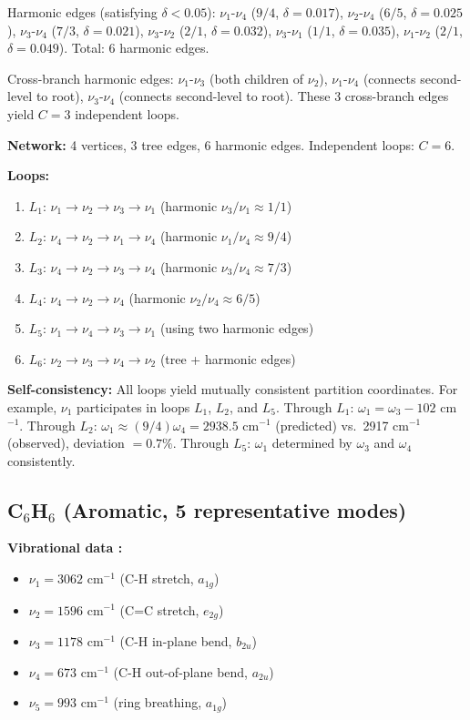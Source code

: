 \documentclass[11pt,twocolumn,a4paper]{article}
\theoremstyle{definition}
\theoremstyle{remark}
\begin{document}
Harmonic edges (satisfying $\delta < 0.05$): $\nu_1$-$\nu_4$ ($9/4$, $\delta = 0.017$), $\nu_2$-$\nu_4$ ($6/5$, $\delta = 0.025$), $\nu_3$-$\nu_4$ ($7/3$, $\delta = 0.021$), $\nu_3$-$\nu_2$ ($2/1$, $\delta = 0.032$), $\nu_3$-$\nu_1$ ($1/1$, $\delta = 0.035$), $\nu_1$-$\nu_2$ ($2/1$, $\delta = 0.049$). Total: 6 harmonic edges.

Cross-branch harmonic edges: $\nu_1$-$\nu_3$ (both children of $\nu_2$), $\nu_1$-$\nu_4$ (connects second-level to root), $\nu_3$-$\nu_4$ (connects second-level to root). These 3 cross-branch edges yield $C = 3$ independent loops.

\textbf{Network:} 4 vertices, 3 tree edges, 6 harmonic edges. Independent loops: $C = 6$.

\textbf{Loops:}
\begin{enumerate}[nosep]
\item $L_1$: $\nu_1 \to \nu_2 \to \nu_3 \to \nu_1$ (harmonic $\nu_3/\nu_1 \approx 1/1$)
\item $L_2$: $\nu_4 \to \nu_2 \to \nu_1 \to \nu_4$ (harmonic $\nu_1/\nu_4 \approx 9/4$)
\item $L_3$: $\nu_4 \to \nu_2 \to \nu_3 \to \nu_4$ (harmonic $\nu_3/\nu_4 \approx 7/3$)
\item $L_4$: $\nu_4 \to \nu_2 \to \nu_4$ (harmonic $\nu_2/\nu_4 \approx 6/5$)
\item $L_5$: $\nu_1 \to \nu_4 \to \nu_3 \to \nu_1$ (using two harmonic edges)
\item $L_6$: $\nu_2 \to \nu_3 \to \nu_4 \to \nu_2$ (tree + harmonic edges)
\end{enumerate}

\textbf{Self-consistency:} All loops yield mutually consistent partition coordinates. For example, $\nu_1$ participates in loops $L_1$, $L_2$, and $L_5$. Through $L_1$: $\omega_1 = \omega_3 - 102$ cm$^{-1}$. Through $L_2$: $\omega_1 \approx (9/4)\omega_4 = 2938.5$ cm$^{-1}$ (predicted) vs.\ 2917 cm$^{-1}$ (observed), deviation $= 0.7\%$. Through $L_5$: $\omega_1$ determined by $\omega_3$ and $\omega_4$ consistently.

\subsection{C$_6$H$_6$ (Aromatic, 5 representative modes)}

\textbf{Vibrational data \citep{shimanouchi1972, nist_webbook}:}
\begin{itemize}[nosep]
\item $\nu_1 = 3062$ cm$^{-1}$ (C-H stretch, $a_{1g}$)
\item $\nu_2 = 1596$ cm$^{-1}$ (C=C stretch, $e_{2g}$)
\item $\nu_3 = 1178$ cm$^{-1}$ (C-H in-plane bend, $b_{2u}$)
\item $\nu_4 = 673$ cm$^{-1}$ (C-H out-of-plane bend, $a_{2u}$)
\item $\nu_5 = 993$ cm$^{-1}$ (ring breathing, $a_{1g}$)
\end{itemize}
\end{document}
